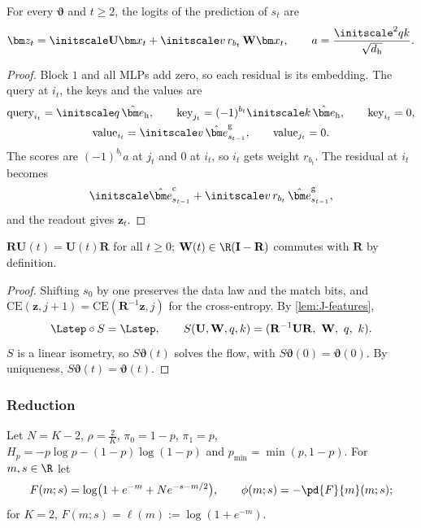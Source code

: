 \begin{lemma}
\label{lem:J-features}
For every $\bm\vartheta$ and $t\ge2$, the logits of the prediction of $s_t$ are
\[
 \bm z_t=\initscale \mathbf U\bm x_t+\initscale v\,r_{b_t}\,\mathbf W\bm x_t,\qquad a=\frac{\initscale^2qk}{\sqrt{d_{\mathrm h}}}.
\]
\end{lemma}

\begin{proof}
Block $1$ and all MLPs add zero, so each residual is its embedding. The query at $i_t$, the keys and the values are
\begin{gather*}
 \text{query}_{i_t}=\initscale q\,\hat{\bm e}_{\mathrm h},\qquad \text{key}_{j_t}=(-1)^{b_t}\initscale k\,\hat{\bm e}_{\mathrm h},\qquad \text{key}_{i_t}=0,\\
 \text{value}_{i_t}=\initscale v\,\hat{\bm e}^{\mathrm g}_{s_{t-1}},\qquad \text{value}_{j_t}=0 .
\end{gather*}
The scores are $(-1)^{b_t}a$ at $j_t$ and $0$ at $i_t$, so $i_t$ gets weight $r_{b_t}$. The residual at $i_t$ becomes
\[
 \initscale\hat{\bm e}^{\mathrm c}_{s_{t-1}}+\initscale v\,r_{b_t}\,\hat{\bm e}^{\mathrm g}_{s_{t-1}},
\]
and the readout gives $\bm z_t$.
\end{proof}

\begin{lemma}
\label{lem:J-symmetry}
$\mathbf R\mathbf U(t)=\mathbf U(t)\mathbf R$ for all $t\ge0$; $\mathbf W(t)\in\R(\mathbf I-\mathbf R)$ commutes with $\mathbf R$ by definition.
\end{lemma}

\begin{proof}
Shifting $s_0$ by one preserves the data law and the match bits, and $\mathrm{CE}(\bm z,j+1)=\mathrm{CE}(\mathbf R^{-1}\bm z,j)$ for the cross-entropy. By \cref{lem:J-features},
\[
 \Lstep\circ S=\Lstep,\qquad S(\mathbf U,\mathbf W,q,k)=(\mathbf R^{-1}\mathbf U\mathbf R,\ \mathbf W,\ q,\ k).
\]
$S$ is a linear isometry, so $S\bm\vartheta(t)$ solves the flow, with $S\bm\vartheta(0)=\bm\vartheta(0)$. By uniqueness, $S\bm\vartheta(t)=\bm\vartheta(t)$.
\end{proof}

\subsubsection{Reduction}

Let $N=K-2$, $\rho=\frac{2}{K}$, $\pi_0=1-p$, $\pi_1=p$, $H_p=-p\log p-(1-p)\log(1-p)$ and $p_{\min}=\min(p,1-p)$. For $m,s\in\R$ let
\[
 F(m;s)=\log\bigl(1+e^{-m}+N e^{-s-m/2}\bigr),\qquad \phi(m;s)=-\pd{F}{m}(m;s);
\]
for $K=2$, $F(m;s)=\ell(m):=\log(1+e^{-m})$.

